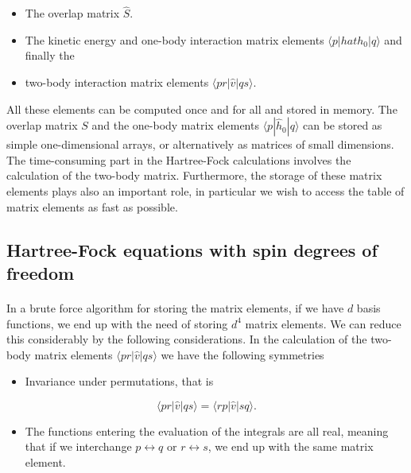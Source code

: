 \documentclass[%
twoside,                 %
final,                   %
10pt]{article}
\begin{document}
\begin{itemize}
  \item The overlap matrix $\hat{S}$.

  \item The kinetic energy and one-body interaction matrix elements $\langle p|hat{h}_0|q\rangle $ and finally the

  \item two-body interaction matrix elements $\langle pr | \hat{v}|qs\rangle$.
\end{itemize}

\noindent
All these elements can be computed once and for all and stored in
memory. The overlap matrix $S$ and the one-body matrix elements
$\langle p|\hat{h}_0|q\rangle $ can be stored as simple
one-dimensional arrays, or alternatively as matrices of small
dimensions.  The time-consuming part in the Hartree-Fock calculations
involves the calculation of the two-body matrix. Furthermore, the
storage of these matrix elements plays also an important role, in
particular we wish to access the table of matrix elements as fast as
possible.



\subsection{Hartree-Fock equations with spin degrees of freedom}

\paragraph{}

In a brute force algorithm for storing the matrix elements, if we have $d$ basis functions, we end up with the need of storing 
$d^4$ matrix elements. We can reduce this considerably by the following considerations.
In the calculation of the two-body matrix elements $\langle pr | \hat{v}|qs\rangle$ we have the following symmetries

\begin{itemize}
  \item Invariance under permutations, that is  
\end{itemize}

\noindent
\begin{equation*} \langle pr | \hat{v}|qs\rangle = \langle rp | \hat{v}|sq\rangle.
\end{equation*}
\begin{itemize}
  \item The functions entering the evaluation of the integrals are all real, meaning that if we interchange $p\leftrightarrow q$ or  $r\leftrightarrow s$, we end up with the same matrix element.
\end{itemize}
\end{document}
